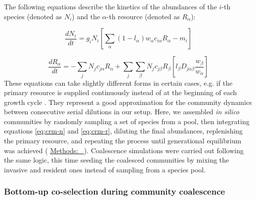 \documentclass[a4paper,10pt]{article}
\newcommand{\methodsref}[1]{%
  \hyperref[{methods:#1}]{%
   Methods:~\nameref*{methods:#1}%
  }%
}
\begin{document}
\begin{mdframed}
The following equations describe the kinetics of the abundances
of the $i$-th species (denoted as $N_i$)
and the $\alpha$-th resource (denoted as $R_\alpha$):

\begin{equation}
\frac{dN_i}{dt} = 
g_i N_i
\left[
\sum_\alpha \left( 1-l_\alpha \right)
w_\alpha c_{i\alpha} R_\alpha
- m_i
\right]
\label{eq:crm-n}
\end{equation}

\begin{equation}
\frac{dR_\alpha}{dt} = 
- \sum_j N_j c_{j\alpha} R_\alpha
+ \sum_j \sum_\beta N_j c_{j\beta} R_\beta
\left[
l_\beta D_{j\alpha\beta} \frac{w_\beta}{w_\alpha}
\right]
\label{eq:crm-r}
\end{equation}
%
These equations can take slightly different forms in certain cases,
e.g. if the primary resource is supplied continuously instead of at the beginning
of each growth cycle \cite{Marsland2019,Marsland2020}.
They represent a good approximation for the community dynamics between consecutive
serial dilutions in our setup.
Here, we assembled \textit{in silico} communities by randomly
sampling a set of species from a pool,
then integrating equations \ref{eq:crm-n} and \ref{eq:crm-r},
diluting the final abundances,
replenishing the primary resource,
and repeating the process until generational equilibrium was achieved
(\methodsref{sim}).
Coalescence simulations were carried out following the same logic,
this time seeding the coalesced communities by mixing the invasive and resident
ones instead of sampling from a species pool.

\bigskip
\end{mdframed}

\clearpage

\subsubsection*{Bottom-up co-selection during community coalescence}
\end{document}

